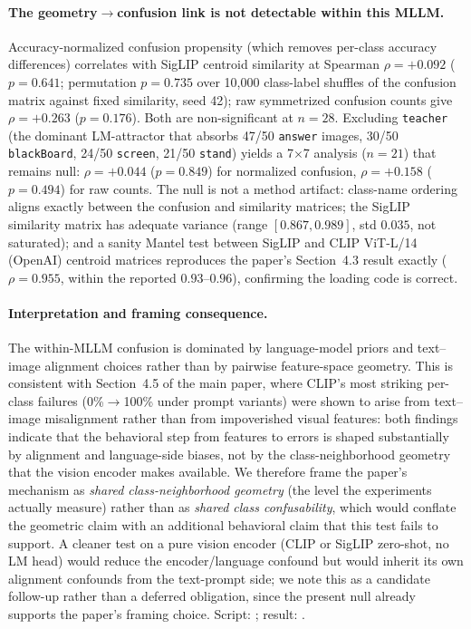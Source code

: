 \documentclass[11pt,a4paper]{article}
\begin{document}
\paragraph{The geometry$\to$confusion link is not detectable within this MLLM.}
Accuracy-normalized confusion propensity (which removes per-class accuracy differences) correlates with SigLIP centroid similarity at Spearman $\rho = +0.092$ ($p = 0.641$; permutation $p = 0.735$ over 10{,}000 class-label shuffles of the confusion matrix against fixed similarity, seed 42); raw symmetrized confusion counts give $\rho = +0.263$ ($p = 0.176$). Both are non-significant at $n=28$. Excluding \texttt{teacher} (the dominant LM-attractor that absorbs 47/50 \texttt{answer} images, 30/50 \texttt{blackBoard}, 24/50 \texttt{screen}, 21/50 \texttt{stand}) yields a 7$\times$7 analysis ($n=21$) that remains null: $\rho = +0.044$ ($p = 0.849$) for normalized confusion, $\rho = +0.158$ ($p = 0.494$) for raw counts. The null is not a method artifact: class-name ordering aligns exactly between the confusion and similarity matrices; the SigLIP similarity matrix has adequate variance (range $[0.867, 0.989]$, std $0.035$, not saturated); and a sanity Mantel test between SigLIP and CLIP ViT-L/14 (OpenAI) centroid matrices reproduces the paper's Section~4.3 result exactly ($\rho = 0.955$, within the reported $0.93$--$0.96$), confirming the loading code is correct.

\paragraph{Interpretation and framing consequence.}
The within-MLLM confusion is dominated by language-model priors and text--image alignment choices rather than by pairwise feature-space geometry. This is consistent with Section~4.5 of the main paper, where CLIP's most striking per-class failures (0\%$\rightarrow$100\% under prompt variants) were shown to arise from text--image misalignment rather than from impoverished visual features: both findings indicate that the behavioral step from features to errors is shaped substantially by alignment and language-side biases, not by the class-neighborhood geometry that the vision encoder makes available. We therefore frame the paper's mechanism as \emph{shared class-neighborhood geometry} (the level the experiments actually measure) rather than as \emph{shared class confusability}, which would conflate the geometric claim with an additional behavioral claim that this test fails to support. A cleaner test on a pure vision encoder (CLIP or SigLIP zero-shot, no LM head) would reduce the encoder/language confound but would inherit its own alignment confounds from the text-prompt side; we note this as a candidate follow-up rather than a deferred obligation, since the present null already supports the paper's framing choice. Script: ; result: .
\end{document}
